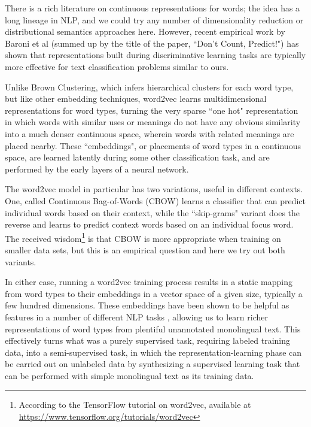 There is a rich literature on continuous representations for words; the idea
has a long lineage in NLP, and we could try any number of dimensionality
reduction or distributional semantics approaches here. However, recent
empirical work by Baroni et al \cite{baroni2014don} (summed up by the title of
the paper, ``Don't Count, Predict!") has shown that representations built
during discriminative learning tasks are typically more effective for text
classification problems similar to ours.

Unlike Brown Clustering, which infers hierarchical clusters for each word type,
but like other embedding techniques, word2vec learns multidimensional
representations for word types, turning the very sparse ``one hot"
representation in which words with similar uses or meanings do not have any
obvious similarity into a much denser continuous space, wherein words with
related meanings are placed nearby. These ``embeddings", or placements of word
types in a continuous space, are learned latently during some other
classification task, and are performed by the early layers of a neural network.

The word2vec model in particular has two variations, useful in different
contexts. One, called Continuous Bag-of-Words (CBOW) learns a classifier that
can predict individual words based on their context, while the ``skip-grams"
variant does the reverse and learns to predict context words based on an
individual focus word. The received wisdom\footnote{According to the TensorFlow
tutorial on word2vec, available at
\url{https://www.tensorflow.org/tutorials/word2vec}} is that CBOW is more
appropriate when training on smaller data sets, but this is an empirical
question and here we try out both variants.

In either case, running a word2vec training process results in a static mapping
from word types to their embeddings in a vector space of a given size,
typically a few hundred dimensions. These embeddings have been shown to be
helpful as features in a number of different NLP tasks \cite{baroni2014don},
allowing us to learn richer representations of word types from plentiful
unannotated monolingual text. This effectively turns what was a purely
supervised task, requiring labeled training data, into a semi-supervised task,
in which the representation-learning phase can be carried out on unlabeled data
by synthesizing a supervised learning task that can be performed with simple
monolingual text as its training data.

